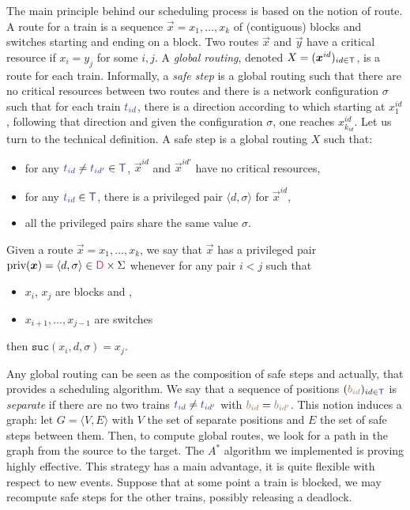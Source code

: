 \documentclass[runningheads]{llncs}
\newcommand{\directions}{\dirFmt{\mathsf{D}}}
\newcommand{\sucblock}{{\mathtt{suc}}}
\newcommand{\dirFmt}[1]{{\color{dircolor} #1}}
\newcommand{\posFmt}[1]{{\color{poscolor}{#1}}}
\newcommand{\bid}[1]{\ensuremath{\posFmt{b_{#1}}}}
\newcommand{\trainFmt}[1]{{\color{traincolor} #1}}
\newcommand{\trains}{{\trainFmt{\mathsf{T}}}}
\newcommand{\tid}[1]{\ensuremath{\trainFmt{t_{#1}}}}
\begin{document}
The main principle behind our scheduling process is based on the notion of route. A route for a train is a sequence $\vec{x} = x_1, \ldots, x_k$ of (contiguous) blocks and switches starting and ending on a block.   Two routes $\vec{x}$ and $\vec{y}$ have a critical resource if  $x_i = y_j$ for some $i,j$. A \emph{global routing}, denoted $X = (\vec{x}^{id})_{id \in \trains}$,  is a route for each train. Informally, a \emph{safe step} is a global routing such that there are no critical resources between two routes and there is a network configuration $\sigma$ such that  for each train $\tid{id}$, there is a direction according to which starting at $x_1^{id}$, following that direction and given the configuration $\sigma$, one reaches $x_{k_{id}}^{id}$. Let us turn to the technical definition.   A safe step is a global routing $X$ such that:
\begin{itemize}
\item for any $\tid{id} \neq \tid{id'} \in \trains$, $\vec{x}^{id}$ and $\vec{x}^{id'}$ have no critical resources,
\item for any $\tid{id} \in \trains$, there is a privileged pair $\langle d, \sigma\rangle$  for $\vec{x}^{id}$,
\item all the privileged pairs share the same value $\sigma$. 
\end{itemize}

Given a route $\vec{x} = x_1, \ldots, x_k$, we say that $\vec{x}$ has a privileged pair $\text{priv}(\vec{x}) = \langle d, \sigma\rangle \in \directions \times \Sigma$ whenever for any pair $i < j$ such that
\begin{itemize}
\item  $x_i$, $x_j$ are blocks and  , 
\item $x_{i+1}, \ldots, x_{j-1}$ are switches
\end{itemize} 
then  $\sucblock(x_i, d, \sigma) = x_j$.


Any global routing can be seen as the composition of safe steps and actually, that provides a scheduling algorithm. We say that a sequence of positions $(\bid{id})_{id \in \trains}$ is \emph{separate} if there are no two trains $\tid{id} \neq \tid{id'}$ with $\bid{id} = \bid{id'}$. This notion induces a graph: let $G = \langle V, E\rangle$ with $V$ the set of separate positions and $E$ the set of safe steps between them.  Then, to compute global routes, we look for a path in the graph from the source to the target. The  $A^*$ algorithm we implemented is proving highly effective. This strategy has a main advantage, it is quite flexible with respect to new events. Suppose that at some point a train is blocked, we may recompute safe steps for the other trains, possibly releasing a deadlock. 
\end{document}
